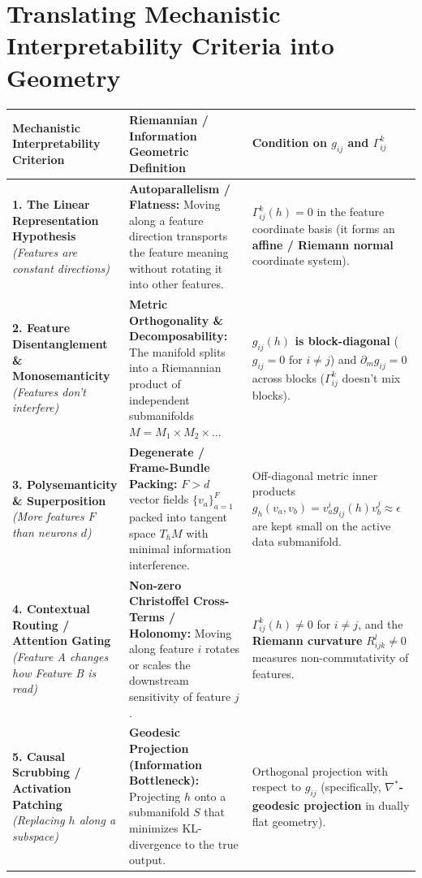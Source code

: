 \documentclass[11pt,a4paper]{article}
\begin{document}
\section{Translating Mechanistic Interpretability Criteria into Geometry}

\begin{table}[h!]
\centering
\small
\renewcommand{\arraystretch}{1.4}
\begin{tabularx}{\textwidth}{@{} >{\raggedright\arraybackslash}p{} Y Y @{}}
\toprule
\textbf{Mechanistic Interpretability Criterion} & \textbf{Riemannian / Information Geometric Definition} & \textbf{Condition on $g_{ij}$ and $\Gamma^k_{ij}$} \\
\midrule
\textbf{1. The Linear Representation Hypothesis} \newline \emph{(Features are constant directions)} &
\textbf{Autoparallelism / Flatness:} Moving along a feature direction transports the feature meaning without rotating it into other features. &
\textbf{$\Gamma^k_{ij}(h) = 0$} in the feature coordinate basis (it forms an \textbf{affine / Riemann normal} coordinate system). \\
\addlinespace
\textbf{2. Feature Disentanglement \& Monosemanticity} \newline \emph{(Features don't interfere)} &
\textbf{Metric Orthogonality \& Decomposability:} The manifold splits into a Riemannian product of independent submanifolds $M = M_1 \times M_2 \times \dots$ &
\textbf{$g_{ij}(h)$ is block-diagonal} ($g_{ij} = 0$ for $i \neq j$) and $\partial_m g_{ij} = 0$ across blocks ($\Gamma^k_{ij}$ doesn't mix blocks). \\
\addlinespace
\textbf{3. Polysemanticity \& Superposition} \newline \emph{(More features $F$ than neurons $d$)} &
\textbf{Degenerate / Frame-Bundle Packing:} $F > d$ vector fields $\{v_a\}_{a=1}^F$ packed into tangent space $T_h M$ with minimal information interference. &
Off-diagonal metric inner products $g_h(v_a, v_b) = v_a^i g_{ij}(h) v_b^j \approx \epsilon$ are kept small on the active data submanifold. \\
\addlinespace
\textbf{4. Contextual Routing / Attention Gating} \newline \emph{(Feature A changes how Feature B is read)} &
\textbf{Non-zero Christoffel Cross-Terms / Holonomy:} Moving along feature $i$ rotates or scales the downstream sensitivity of feature $j$. &
\textbf{$\Gamma^k_{ij}(h) \neq 0$} for $i \neq j$, and the \textbf{Riemann curvature} $R^l_{ijk} \neq 0$ measures non-commutativity of features. \\
\addlinespace
\textbf{5. Causal Scrubbing / Activation Patching} \newline \emph{(Replacing $h$ along a subspace)} &
\textbf{Geodesic Projection (Information Bottleneck):} Projecting $h$ onto a submanifold $S$ that minimizes KL-divergence to the true output. &
Orthogonal projection with respect to $g_{ij}$ (specifically, \textbf{$\nabla^*$-geodesic projection} in dually flat geometry). \\
\bottomrule
\end{tabularx}
\end{table}
\end{document}
